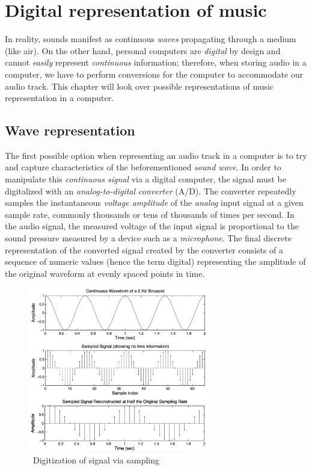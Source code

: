 \chapter{Digital representation of music}\label{ch:digital-audio-representation}

\begin{chapterabstract}
    In reality, sounds manifest as continuous \textit{waves} propagating through a medium (like air).
    On the other hand, personal computers are \textit{digital} by design and cannot \textit{easily} represent \textit{continuous} information;
    therefore, when storing audio in a computer, we have to perform conversions for the computer to accommodate our audio track.
    This chapter will look over possible representations of music representation in a computer.
\end{chapterabstract}


\section{Wave representation}\label{sec:wave-representation}

The first possible option when representing an audio track in a computer is to try and capture characteristics of the beforementioned \textit{sound wave}.
In order to manipulate this \textit{continuous signal} via a digital computer, the signal must be digitalized with an \textit{analog-to-digital converter} (A/D).
The converter repeatedly samples the instantaneous \textit{voltage amplitude} of the \textit{analog} input signal at a given sample rate, commonly thousands or tens of thousands of times per second.
In the audio signal, the measured voltage of the input signal is proportional to the sound pressure measured by a device such as a \textit{microphone}.
The final discrete representation of the converted signal created by the converter consists of a sequence of numeric values (hence the term digital) representing the amplitude of the original waveform at evenly spaced points in time.~\cite{sound-representation}

\begin{figure}
    \centering
    \includegraphics[width=0.7\textwidth]{assets/sound-sampling}
    \caption{~Digitization of signal via sampling~\cite{smyth_2019}}\label{fig:sound-digitization}
\end{figure}



